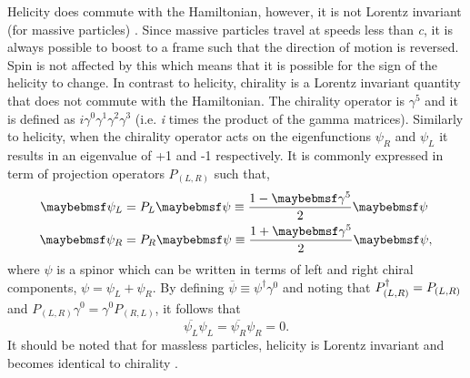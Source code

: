 Helicity does commute with the Hamiltonian, however, it is not Lorentz invariant (for massive particles) \cite{Introduction_to_Particle_and_Astroparticle_Physics_book}. Since massive particles travel at speeds less than \textit{c}, it is always possible to boost to a frame such that the direction of motion is reversed. Spin is not affected by this which means that it is possible for the sign of the helicity to change. In contrast to helicity, chirality is a Lorentz invariant quantity that does not commute with the Hamiltonian. The chirality operator is $\gamma^5$ and it is defined as $i\gamma^0\gamma^1\gamma^2\gamma^3$ (i.e. \textit{i} times the product of the gamma matrices). Similarly to helicity, when the chirality operator acts on the eigenfunctions $\psi_R$ and $\psi_L$ it results in an eigenvalue of +1 and -1 respectively. It is commonly expressed in term of projection operators $P_{(L, R)}$ such that,
\begin{equation}
\begin{split}
    \psi_L &= P_L\psi \isdefined \frac{1-\gamma^5}{2}\psi \\
    \psi_R &= P_R\psi \isdefined \frac{1+\gamma^5}{2}\psi,
\end{split}
\end{equation}
where $\psi$ is a spinor which can be written in terms of left and right chiral components, $\psi = \psi_L + \psi_R$.
By defining $\overline{\psi} \equiv \psi^\dag \gamma^0$ and noting that $P_{(L,R)}^\dagger = P_{(L,R)}$ and $P_{(L,R)}\gamma^0 = \gamma^0P_{(R,L)}$, it follows that
\begin{equation}\label{eqn:chiral identity}
    \overline{\psi_L}\psi_L = \overline{\psi_R}\psi_R = 0.
\end{equation}
It should be noted that for massless particles, helicity is Lorentz invariant and becomes identical to chirality \cite{Fundamentals_of_Neutrino_Physics_and_Astrophysics}.

